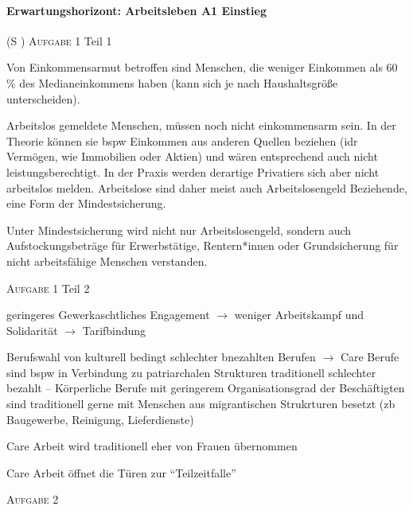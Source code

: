 \paragraph{Erwartungshorizont: Arbeitsleben A1 Einstieg} (\gls{S} \pageref{ARBEITSLEBEN-A1})
\textsc{Aufgabe 1} Teil 1 \quad
\begin{myitemize}
    \item Von Einkommensarmut betroffen sind Menschen, die weniger Einkommen als 60\,\% des Medianeinkommens haben (kann sich je nach Haushaltsgröße unterscheiden). 
    \item Arbeitslos gemeldete Menschen, müssen noch nicht einkommensarm sein. In der Theorie können sie \gls{bspw} Einkommen aus anderen Quellen beziehen (\gls{idr} Vermögen, wie Immobilien oder Aktien) und wären entsprechend auch nicht leistungsberechtigt. In der Praxis werden derartige Privatiers sich aber nicht arbeitslos melden. Arbeitslose sind daher meist auch Arbeitslosengeld Beziehende, eine Form der Mindestsicherung. 
    \item Unter Mindestsicherung wird nicht nur Arbeitslosengeld, sondern auch Aufstockungsbeträge für Erwerbstätige, Rentern*innen oder Grundsicherung für nicht arbeitsfähige Menschen verstanden. 
\end{myitemize}

\textsc{Aufgabe 1} Teil 2 \quad
\begin{myitemize}
    \item geringeres Gewerkaschtliches Engagement $\rightarrow$ weniger Arbeitskampf und Solidarität $\rightarrow$ Tarifbindung
    \item Berufswahl von kulturell bedingt schlechter bnezahlten Berufen $\rightarrow$ Care Berufe sind \gls{bspw} in Verbindung zu patriarchalen Strukturen traditionell schlechter bezahlt -- Körperliche Berufe mit geringerem Organisationsgrad der Beschäftigten sind traditionell gerne mit Menschen aus migrantischen Strukrturen besetzt (\gls{zb} Baugewerbe, Reinigung, Lieferdienste)
    \item Care Arbeit wird traditionell eher von Frauen übernommen
    \item Care Arbeit öffnet die Türen zur \enquote{Teilzeitfalle}
\end{myitemize}

\textsc{Aufgabe 2} \quad




